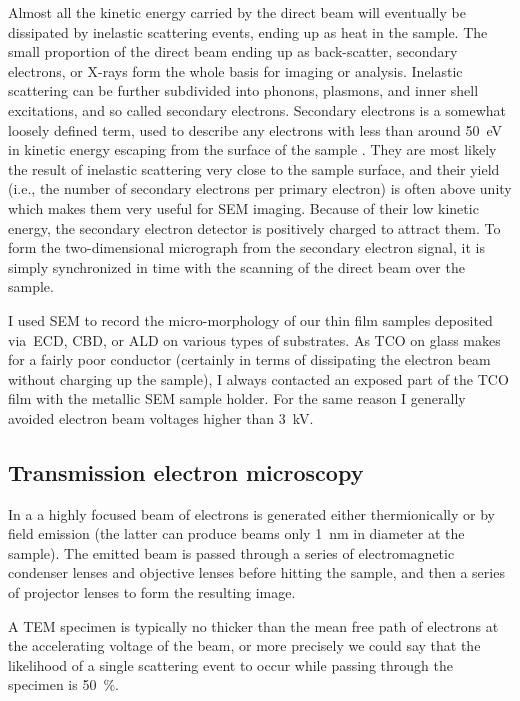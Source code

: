 \documentclass[webedition,openright,titles,swedish,english]{LuaUUThesis}\usepackage[]{graphicx}\usepackage[]{xcolor}
\newcommand{\ie}{i.e.}
\newcommand{\via}{via}
\begin{document}
Almost all the kinetic energy carried by the direct beam will eventually be
dissipated by inelastic scattering events, ending up as heat in the sample.
The small proportion of the direct beam ending up as back-scatter, secondary
electrons, or X-rays form the whole basis for imaging or analysis.
%
Inelastic scattering can be further subdivided into phonons, plasmons,
and inner shell excitations, and so called secondary electrons.
Secondary electrons is a somewhat loosely defined term, used to describe any electrons with
less than around \qty{50}{\eV} in kinetic energy escaping from
the surface of the sample \cite{Goodhew2001}.
They are most likely the result of inelastic scattering
very close to the sample surface, and
their yield (\ie, the number of secondary electrons per primary electron)
is often above unity which makes them very useful for \gls{SEM} imaging.
Because of their low kinetic energy, the secondary electron detector is
positively charged to attract them.
To form the two-dimensional micrograph from the secondary electron signal, it is simply
synchronized in time with the scanning of the direct beam over the sample.

I used \gls{SEM} to record the micro-morphology of our thin film samples
deposited \via\ \gls{ECD}, \gls{CBD}, or \gls{ALD} on various types of
 substrates.
As \gls{TCO} on glass makes for a fairly poor conductor (certainly in terms of
dissipating the electron beam without charging up the sample), I always
contacted an exposed part of the \gls{TCO} film with the metallic \gls{SEM}
sample holder.
For the same reason I generally avoided electron beam voltages higher than \qty{3}{\kV}.



\subsection{Transmission electron microscopy}
\label{methods:transmission-electron-microscopy}

In a  a highly focused beam of electrons is generated either
thermionically or by field emission (the latter can produce beams only \qty{1}{\nm}
in diameter at the sample).
The emitted beam is passed through a series of electromagnetic condenser lenses
and objective lenses before hitting the sample, and then a series of projector lenses
to form the resulting image.

A \gls{TEM} specimen is typically no thicker than the mean free path of
electrons at the accelerating voltage of the beam, or more precisely
we could say that the likelihood of a single scattering event to occur while
passing through the specimen is \qty{50}{\percent}.
\end{document}

